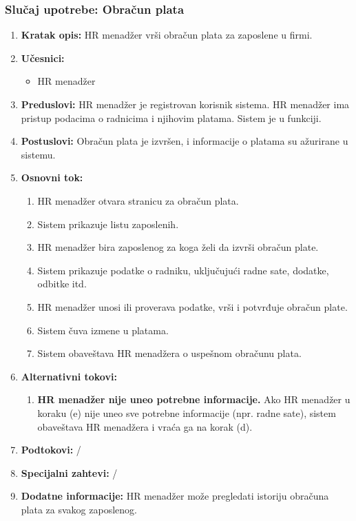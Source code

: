 \documentclass[a4paper]{article}
\begin{document}
\subsubsection{Slučaj upotrebe: Obračun plata}
\begin{enumerate}
    \item \textbf{Kratak opis:} HR menadžer vrši obračun plata za zaposlene u firmi.
    \item \textbf{Učesnici:}
        \begin{itemize}
            \item HR menadžer
        \end{itemize}
    \item \textbf{Preduslovi:} HR menadžer je registrovan korisnik sistema. HR menadžer ima pristup podacima o radnicima i njihovim platama. Sistem je u funkciji.
    \item \textbf{Postuslovi:} Obračun plata je izvršen, i informacije o platama su ažurirane u sistemu.
    \item \textbf{Osnovni tok:}
        \begin{enumerate}
            \item HR menadžer otvara stranicu za obračun plata.
            \item Sistem prikazuje listu zaposlenih.
            \item HR menadžer bira zaposlenog za koga želi da izvrši obračun plate.
            \item Sistem prikazuje podatke o radniku, uključujući radne sate, dodatke, odbitke itd.
            \item HR menadžer unosi ili proverava podatke, vrši i potvrđuje obračun plate.
            \item Sistem čuva izmene u platama.
            \item Sistem obaveštava HR menadžera o uspešnom obračunu plata.
        \end{enumerate}
    \item \textbf{Alternativni tokovi:}
        \begin{enumerate}
            \item \textbf{HR menadžer nije uneo potrebne informacije.} Ako HR menadžer u koraku (e) nije uneo sve potrebne informacije (npr. radne sate), sistem obaveštava HR menadžera i vraća ga na korak (d).
        \end{enumerate}
    \item \textbf{Podtokovi:} /
    \item \textbf{Specijalni zahtevi:} /
    \item \textbf{Dodatne informacije:} HR menadžer može pregledati istoriju obračuna plata za svakog zaposlenog.
\end{enumerate}
\end{document}

